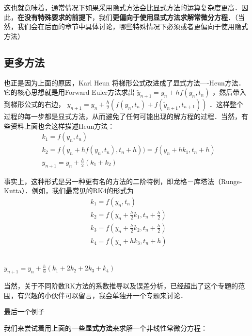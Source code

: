 这也就意味着，通常情况下如果采用隐式方法会比显式方法的运算复杂度更高．因此，\textbf{在没有特殊要求的前提下}，我们\textbf{更偏向于使用显式方法求解常微分方程}．（当然，我们会在后面的章节中具体讨论，哪些特殊情况下必须或者更偏向于使用隐式方法）

\subsection{更多方法}

也正是因为上面的原因，Karl Heun 将梯形公式改进成了显式方法----Heun方法．它的核心思想就是用Forward Euler方法求出  $\tilde{y}_{n+1}=y_n+hf(y_n,t_n)$ ，然后带入到梯形公式的右边，  $y_{n+1}=y_n+\frac{h}{2}\left(f(y_n,t_n)+f(\tilde{y}_{n+1},t_{n+1}) \right)$ ．这样整个过程的每一步都是显式方法，从而避免了任何可能出现的解方程的过程．当然，有些资料上面也会这样描述Heun方法：
\begin{equation}
\begin{aligned}
&k_1=f(y_n,t_n)\\
&k_2=f(y_n+hf(y_n,t_n),t_n+h))=f(y_n+hk_1,t_n+h)\\
&y_{n+1}=y_n+\frac{h}{2}(k_1+k_2)
\end{aligned}
\end{equation}

事实上，这种形式是另一种更有名的方法的二阶特例，即龙格－库塔法（Runge-Kutta）．例如，我们最常见的RK4的形式为
\begin{equation}
\begin{aligned}
&k_1=f(y_n,t_n)\\
&k_2=f\left(y_n+\frac{h}{2}k_1, t_n+\frac{h}{2}\right)\\
&k_3=f\left(y_n+\frac{h}{2}k_2, t_n+\frac{h}{2}\right)\\
&k_4=f\left(y_n+hk_3, t_n+h\right)\\

\end{aligned}
\end{equation}
 $$  

 $$  

 $$  

 $$  

 $y_{n+1}=y_{n}+\frac{h}{6}(k_1+2k_2+2k_3+k_4)$  

当然，关于不同阶数RK方法的系数推导以及误差分析，已经超出了这个专题的范围，有兴趣的小伙伴可以留言，我会单独开一个专题来讨论．



最后一个例子

我们来尝试着用上面的一些\textbf{显式方法}来求解一个非线性常微分方程：


